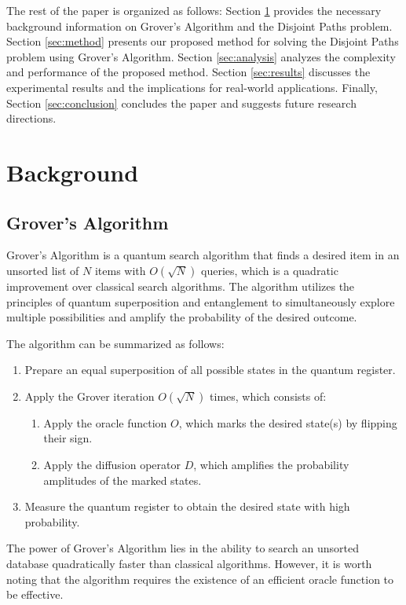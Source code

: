 The rest of the paper is organized as follows: Section \ref{sec:background} provides the necessary background information on Grover's Algorithm and the Disjoint Paths problem. Section \ref{sec:method} presents our proposed method for solving the Disjoint Paths problem using Grover's Algorithm. Section \ref{sec:analysis} analyzes the complexity and performance of the proposed method. Section \ref{sec:results} discusses the experimental results and the implications for real-world applications. Finally, Section \ref{sec:conclusion} concludes the paper and suggests future research directions.

\section{Background}
\label{sec:background}

\subsection{Grover's Algorithm}

Grover's Algorithm is a quantum search algorithm that finds a desired item in an unsorted list of $N$ items with $O(\sqrt{N})$ queries, which is a quadratic improvement over classical search algorithms. The algorithm utilizes the principles of quantum superposition and entanglement to simultaneously explore multiple possibilities and amplify the probability of the desired outcome.

The algorithm can be summarized as follows:

\begin{enumerate}
    \item Prepare an equal superposition of all possible states in the quantum register.
    \item Apply the Grover iteration $O(\sqrt{N})$ times, which consists of:
    \begin{enumerate}
        \item Apply the oracle function $O$, which marks the desired state(s) by flipping their sign.
        \item Apply the diffusion operator $D$, which amplifies the probability amplitudes of the marked states.
    \end{enumerate}
    \item Measure the quantum register to obtain the desired state with high probability.
\end{enumerate}

The power of Grover's Algorithm lies in the ability to search an unsorted database quadratically faster than classical algorithms. However, it is worth noting that the algorithm requires the existence of an efficient oracle function to be effective.

